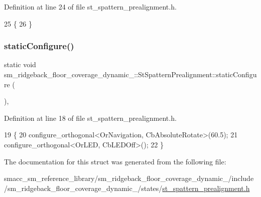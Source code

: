 Definition at line 24 of file st\+\_\+spattern\+\_\+prealignment.\+h.


\begin{DoxyCode}
25   \{ 
26   \}
\end{DoxyCode}
\mbox{\label{structsm__ridgeback__floor__coverage__dynamic__1_1_1StSpatternPrealignment_a48a5621743d589cf6f4ee5ffa612d34b}} 
\subsubsection{\texorpdfstring{static\+Configure()}{staticConfigure()}}
{\footnotesize\ttfamily static void sm\+\_\+ridgeback\+\_\+floor\+\_\+coverage\+\_\+dynamic\+\_\+::\+St\+Spattern\+Prealignment\+::static\+Configure (\begin{DoxyParamCaption}{ }\end{DoxyParamCaption})\hspace{0.3cm}{\ttfamily [inline]}, {\ttfamily [static]}}



Definition at line 18 of file st\+\_\+spattern\+\_\+prealignment.\+h.


\begin{DoxyCode}
19   \{
20     configure\_orthogonal<OrNavigation, CbAbsoluteRotate>(60.5);
21     configure\_orthogonal<OrLED, CbLEDOff>();
22   \}
\end{DoxyCode}


The documentation for this struct was generated from the following file\+:\begin{DoxyCompactItemize}
\item 
smacc\+\_\+sm\+\_\+reference\+\_\+library/sm\+\_\+ridgeback\+\_\+floor\+\_\+coverage\+\_\+dynamic\+\_/include/sm\+\_\+ridgeback\+\_\+floor\+\_\+coverage\+\_\+dynamic\+\_/states/\hyperlink{sm__ridgeback__floor__coverage__dynamic__1_2include_2sm__ridgeback__floor__coverage__dynamic__1_e7969f379bb0db0960133940c9ef6c04}{st\+\_\+spattern\+\_\+prealignment.\+h}\end{DoxyCompactItemize}
